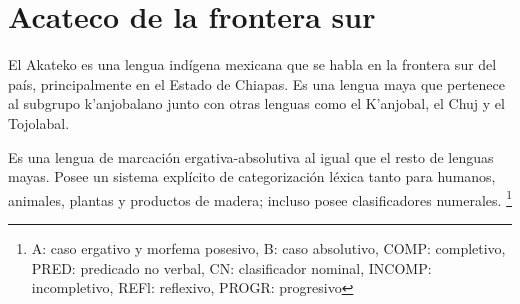 \section*{Acateco de la frontera sur}

\noindent El Akateko es una lengua indígena mexicana que se habla en la frontera sur del país, principalmente en el Estado de Chiapas. Es una lengua maya que pertenece al subgrupo k'anjobalano junto con otras lenguas como el K'anjobal, el Chuj y el Tojolabal.

Es una lengua de marcación ergativa-absolutiva al igual que el resto de lenguas mayas. Posee un sistema explícito de categorización léxica tanto para humanos, animales, plantas y productos de madera; incluso posee clasificadores numerales.%
\footnote{A: caso ergativo y morfema posesivo, B: caso absolutivo, COMP: completivo, PRED: predicado no verbal, CN: clasificador nominal, INCOMP: incompletivo, REFl: reflexivo, PROGR: progresivo} \vspace{0.3cm}


